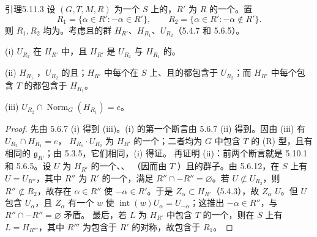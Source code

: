 \begin{SGAresult}{引理}{5.11.3}
设 $(G,T,M,R)$ 为一个 $S$ 上的，$R'$ 为 $R$ 的一个。置
\[R_1=\{\alpha\in R':-\alpha\in R'\},\qquad R_2=\{\alpha\in R':-\alpha\notin R'\}.\]
则 $R_1,R_2$ 均为。考虑且的群 $H_{R'}$、$H_{R_1}$、$U_{R_2}$（5.4.7 和 5.6.5）。

(i) $U_{R_2}$ 在 $H_{R'}$ 中，且 $H_{R'}$ 是 $U_{R_2}$ 与 $H_{R_1}$ 的。

(ii) $H_{R_1}$ ，$U_{R_2}$ 的且；$H_{R'}$ 中每个在 $S$ 上、且的都包含于 $U_{R_2}$；而 $H_{R'}$ 中每个包含 $T$ 的都包含于 $H_{R_1}$。

(iii) $U_{R_2}\cap\operatorname{Norm}_G(H_{R_1})=e$。
\end{SGAresult}
\begin{proof}
先由 5.6.7 (i) 得到 (iii)。(i) 的第一个断言由 5.6.7 (ii) 得到。因由 (iii) 有 $U_{R_2}\cap H_{R_1}=e$， $H_{R_1}\cdot U_{R_2}$ 为 $H_{R'}$ 的一个；二者均为 $G$ 中包含 $T$ 的 (R) 型，且有相同的 $\mathfrak g_{R'}$；由 5.3.5，它们相同，(i) 得证。
再证明 (ii)：前两个断言就是 5.10.1 和 5.6.5。设 $U$ 为 $H_{R'}$ 的一个、、
（因而由 $T$ ）且的群子。由 5.6.12，在 $S$ 上有 $U=U_{R''}$，其中 $R''$ 为 $R'$ 的一个，满足 $R''\cap-R''=\varnothing$。若 $U\not\subset U_{R_2}$，则 $R''\not\subset R_2$，故存在 $\alpha\in R''$ 使 $-\alpha\in R'$。于是 $Z_\alpha\subset H_{R'}$（5.4.3），故 $Z_\alpha$  $U$。但 $U$ 包含 $U_\alpha$，且 $Z_\alpha$ 有一个 $w$ 使 $\operatorname{int}(w)U_\alpha=U_{-\alpha}$；这推出 $-\alpha\in R''$，与 $R''\cap-R''=\varnothing$ 矛盾。
最后，若 $L$ 为 $H_{R'}$ 中包含 $T$ 的一个，则在 $S$ 上有 $L=H_{R'''}$，其中 $R'''$ 为包含于 $R'$ 的对称，故包含于 $R_1$。
\end{proof}
